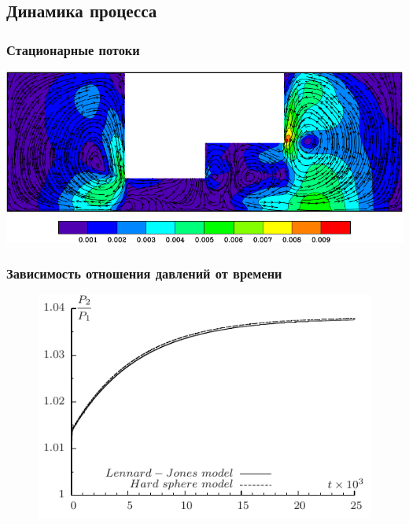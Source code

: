 \documentclass[ucs]{beamer}
\begin{document}
\subsection{Динамика процесса}
\begin{frame}
	\frametitle{Стационарные потоки}
	\includegraphics[width=\columnwidth]{flows.pdf}
\end{frame}

\begin{frame}
	\frametitle{Зависимость отношения давлений от времени}
	\begin{figure}[c]
		\includegraphics[width=\columnwidth]{p2t}
	\end{figure}
\end{frame}
\end{document}
